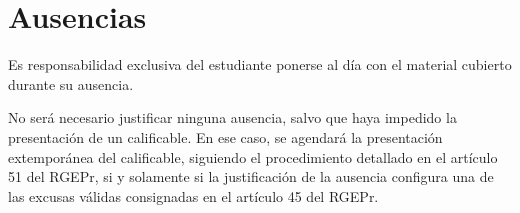 \section{Ausencias}
Es responsabilidad exclusiva del estudiante ponerse al día con el material cubierto durante su ausencia.

No será necesario justificar ninguna ausencia, salvo que haya impedido la presentación de un calificable. En ese caso, se agendará la presentación extemporánea del calificable, siguiendo el procedimiento detallado en el artículo 51 del RGEPr, si y solamente si la justificación de la ausencia configura una de las excusas válidas consignadas en el artículo 45 del RGEPr.
